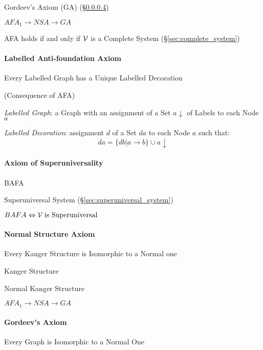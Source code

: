 Gordeev's Axiom (GA) (\S\ref{sec:gordeevs_axiom})

$AFA_1 \to NSA \to GA$

AFA holds if and only if $\mathcal{V}$ is a Complete System
(\S\ref{sec:complete_system})



\paragraph{Labelled Anti-foundation Axiom}
\label{sec:labelled_antifoundation}\hfill

\cite{aczel88}

Every Labelled Graph has a Unique Labelled Decoration

(Consequence of AFA)

\emph{Labelled Graph}: a Graph with an assignment of a Set
$a\downarrow$ of Labels to each Node $a$

\emph{Labelled Decoration}: assignment $d$ of a Set $d a$ to each Node
$a$ such that:
\[
  da = \{db | a \to b\} \cup a \downarrow
\]



\paragraph{Axiom of Superuniversality}
\label{sec:superuniversality_axiom}\hfill

BAFA

Superuniversal System (\S\ref{sec:superuniversal_system})

$BAFA \Leftrightarrow \mathcal{V} \;\text{is Superuniversal}$



\paragraph{Normal Structure Axiom}
\label{sec:normal_structure_axiom}\hfill

Every Kanger Structure is Isomorphic to a Normal one

Kanger Structure

Normal Kanger Structure

$AFA_1 \to NSA \to GA$


\paragraph{Gordeev's Axiom}\label{sec:gordeevs_axiom}\hfill

Every Graph is Isomorphic to a Normal One

